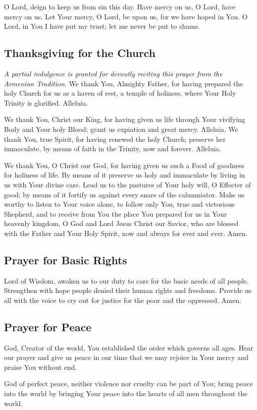 \documentclass[12pt]{article}
\newcommand{\prayertitle}[1]{\subsection{#1}}
\newcommand{\indulgencedprayertitle}[1]{\prayertitle{#1 \protect\kreuz}}
\newcommand{\note}[1]{{\small{\textsl{#1}}}\newline}
\begin{document}
O Lord, deign to keep us from sin this day.
Have mercy on us, O Lord, have mercy on us.
Let Your mercy, O Lord, be upon us, for we have hoped in You.
O Lord, in You I have put my trust;
let me never be put to shame.

\indulgencedprayertitle{Thanksgiving for the Church}
\note{A partial indulgence is granted for devoutly reciting this prayer from the Armenian Tradition.}
We thank You, Almighty Father, for having prepared the holy Church for us as a haven
of rest, a temple of holiness, where Your Holy Trinity is glorified. Alleluia.

We thank You, Christ our King, for having given us life through Your vivifying Body
and Your holy Blood; grant us expiation and great mercy. Alleluia.
\newpage
We thank You, true Spirit, for having renewed the holy Church; preserve her immaculate, by means of faith in the Trinity, now and forever. Alleluia.

We thank You, O Christ our God, for having given us such a Food of goodness for
holiness of life.
By means of it preserve us holy and immaculate by living in us with Your divine care.
Lead us to the pastures of Your holy will, O Effecter of good; by means of it fortify us against every snare of the calumniator.
Make us worthy to listen to Your voice alone, to follow only You, true and victorious Shepherd, and to receive from You the place You prepared for us in Your heavenly kingdom, O God and Lord Jesus Christ our Savior, who are blessed with the Father and Your Holy Spirit, now and always for ever and ever.
Amen.

\prayertitle{Prayer for Basic Rights}
Lord of Wisdom, awaken us to our duty to care for the basic needs of all people.
Strengthen with hope people denied their human rights and freedoms.
Provide us all with the voice to cry out for justice for the poor and the oppressed.
Amen.

\prayertitle{Prayer for Peace}
God, Creator of the world, You established the order which governs all ages.
Hear our prayer and give us peace in our time that we may rejoice in Your mercy and praise You without end.

God of perfect peace, neither violence nor cruelty can be part of You;
bring peace into the world by bringing Your peace into the hearts of all men throughout the world.
\end{document}
